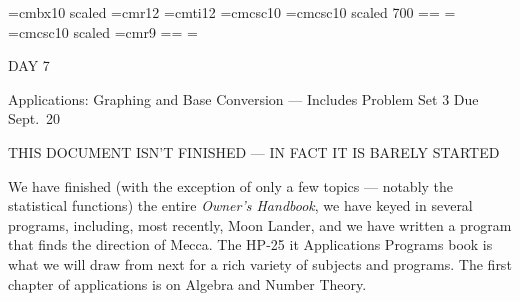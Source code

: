 
\def\folio{\ifnum\pageno>0 \number\pageno \else
   \ifnum\pageno<0 \romannumeral-\pageno \else\fi\fi}

\font\largebf=cmbx10  scaled 
\font\largerm=cmr12
\font\largeit=cmti12
\font\tensc=cmcsc10
\font\sevensc=cmcsc10 scaled 700
\newfam\scfam \def\sc{\fam\scfam\tensc}
\textfont\scfam=\tensc \scriptfont\scfam=\sevensc
\scriptscriptfont\scfam=\sevensc
\font\largesc=cmcsc10 scaled 
\font\ninerm=cmr9
\newfam\srfam \def\sr{\fam\srfam\ninerm}
\textfont\srfam=\ninerm \scriptfont\srfam=\sevenrm
\scriptscriptfont\srfam=\fiverm




\null\vskip36pt

\centerline{\largerm DAY 7}
\nobreak\bigskip

\centerline{\largeit Applications: Graphing and Base Conversion --- Includes Problem Set 3 Due Sept.~20 }
\nobreak\bigskip

\centerline{\largeit THIS DOCUMENT ISN'T FINISHED --- IN FACT IT IS BARELY STARTED}
\nobreak\bigskip

\nobreak\bigskip

\noindent We have finished (with the exception of only a few topics --- notably the statistical functions) the entire {\it Owner's Handbook}, we have keyed in several programs, including, most recently, Moon Lander, and we have written a program that finds the direction of Mecca. The HP-25 {it Applications Programs} book is what we will draw from next for a rich variety of subjects and programs. The first chapter of applications is on Algebra and Number Theory.

\bigskip

\nobreak\bigskip

\nobreak\bigskip


\nobreak\bigskip

\bye

